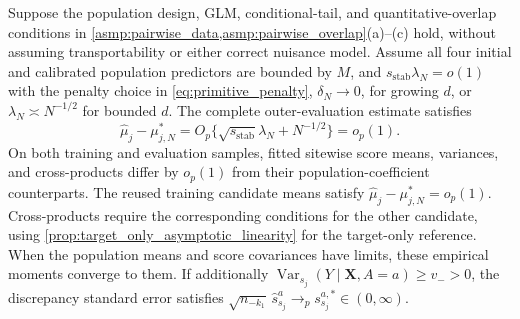 \documentclass[12pt]{article}
\begin{document}
\begin{proposition}\label{prop:candidate_consistency}
Suppose the population design, GLM, conditional-tail, and quantitative-overlap conditions in \cref{asmp:pairwise_data,asmp:pairwise_overlap}(a)--(c) hold, without assuming transportability or either correct nuisance model. Assume all four initial and calibrated population predictors are bounded by $M$, and $s_{\mathrm{stab}}\lambda_N=o(1)$ with the penalty choice in \cref{eq:primitive_penalty}, $\delta_N\to0$, for growing $d$, or $\lambda_N\asymp N^{-1/2}$ for bounded $d$. The complete outer-evaluation estimate satisfies
\[
\widehat\mu_j-\mu_{j,N}^*
=O_p\{\sqrt{s_{\mathrm{stab}}}\lambda_N+N^{-1/2}\}
=o_p(1).
\]
On both training and evaluation samples, fitted sitewise score means, variances, and cross-products differ by $o_p(1)$ from their population-coefficient counterparts. The reused training candidate means satisfy $\widehat\mu_j-\mu_{j,N}^*=o_p(1)$. Cross-products require the corresponding conditions for the other candidate, using \cref{prop:target_only_asymptotic_linearity} for the target-only reference. When the population means and score covariances have limits, these empirical moments converge to them. If additionally $\operatorname{Var}_{s_j}(Y\mid\boldsymbol X,A=a)\ge v_->0$, the discrepancy standard error satisfies $\sqrt{n_{-k_1}}\,\widehat s_{s_j}^a\to_p s_{s_j}^{a,*}\in(0,\infty)$.
\end{proposition}
\end{document}
